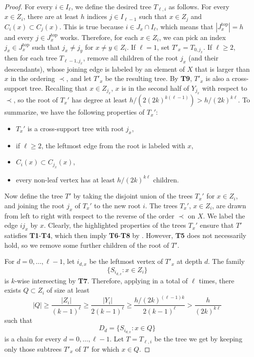 \documentclass[10pt,a4paper]{amsart}
\begin{document}
\begin{proof}
For every $i\in I_{\ell}$, we define the desired tree $T_{\ell,i}$ as follows. For every $x\in Z_i$, there are at least $h$ indices $j\in I_{\ell-1}$ such that $x\in Z_j$ and $C_i(x)\subset C_j(x)$. This is true because $i\in J_x\cap I_{\ell}$, which means that $|J_x^{\text{top}}|=h$ and every $j\in J_x^{\text{top}}$ works. Therefore, for each $x\in Z_i$, we can pick an index $j_x\in J_x^{\text{top}}$ such that $j_x\neq j_y$ for $x\neq y\in Z_i$. If $\ell=1$, set $T'_x=T_{0,j_x}$. If $\ell\geq 2$, then for each tree $T_{\ell-1,j_x}$, remove all children of the root $j_x$ (and their descendants), whose joining edge is labeled by an element of $X$ that is larger than $x$ in the ordering $\prec$, and let $T'_{x}$ be the resulting tree. By \textbf{T9}, $T'_x$ is also a cross-support tree. Recalling that $x\in Z_{j_x}$, $x$ is in the second half of $Y_{j_x}$ with respect to $\prec$, so the root of $T_{x}'$ has degree at least $h/(2(2k)^{k(\ell-1)})>h/(2k)^{k\ell}$. To summarize, we have the following properties of $T_x'$:
\begin{itemize}
    \item $T_{x}'$ is a cross-support tree with root $j_x$,
    \item if $\ell\geq 2$, the leftmost edge from the root is labeled with  $x$,
    \item $C_i(x)\subset C_{j_x}(x)$,
    \item every non-leaf vertex has at least $h/(2k)^{k\ell}$ children. 
\end{itemize}

Now define the tree $T'$ by taking the disjoint union of the trees $T_{x}'$ for $x\in Z_i$, and joining the root $j_x$ of $T_x'$ to the new root $i$. The trees $T_{x}'$, $x\in Z_i$, are drawn from left to right with respect to the reverse of the order $\prec$ on $X$.  We label the edge $ij_x$ by $x$. Clearly, the highlighted properties of the trees $T_x'$ ensure that $T'$ satisfies \textbf{T1}-\textbf{T4}, which then imply \textbf{T6}-\textbf{T8} by . However, \textbf{T5} does not necessarily hold, so we remove some further children of the root of $T'$.

 For $d=0,\dots,\ell-1$, let $i_{d,x}$ be the leftmost vertex of $T'_x$ at depth $d$. The family 
$$\{S_{i_{d,x}}:x\in Z_i\}$$ is $k$-wise intersecting by \textbf{T7}. Therefore, applying  in a total of $\ell$ times, there exists $Q\subset Z_i$ of size at least 
$$|Q|\geq \frac{|Z_i|}{(k-1)^{\ell}}\geq \frac{|Y_i|}{2(k-1)^{\ell}}\geq \frac{h/(2k)^{(\ell-1) k}}{2(k-1)^{\ell}}>\frac{h}{(2k)^{k\ell}}$$
such that $$D_d=\{S_{i_{d,x}}:x\in Q\}$$ is a chain for every $d=0,\dots,\ell-1$. Let $T=T_{\ell,i}$ be the tree we get by keeping only those subtrees $T'_x$ of $T'$ for which $x\in Q$. 


\end{proof}
\end{document}
